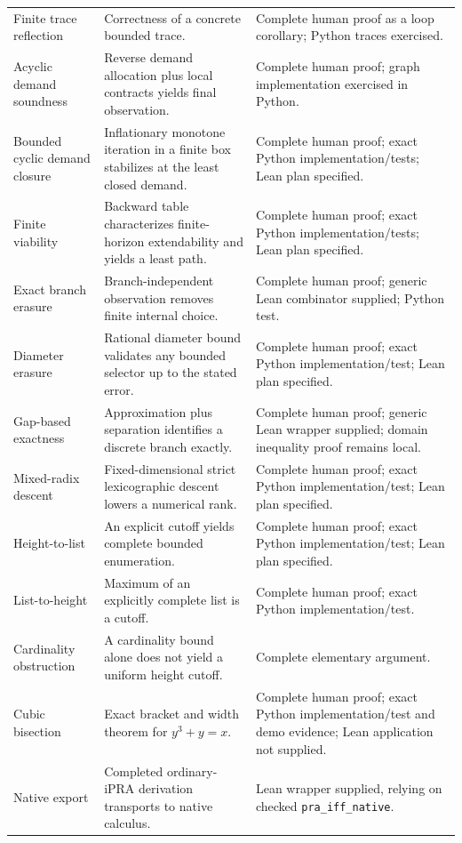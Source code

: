 \begin{longtable}{@{}p{}p{}p{}@{}}
Finite trace reflection & Correctness of a concrete bounded trace. & Complete human proof as a loop corollary; Python traces exercised. \\
Acyclic demand soundness & Reverse demand allocation plus local contracts yields final observation. & Complete human proof; graph implementation exercised in Python. \\
Bounded cyclic demand closure & Inflationary monotone iteration in a finite box stabilizes at the least closed demand. & Complete human proof; exact Python implementation/tests; Lean plan specified. \\
Finite viability & Backward table characterizes finite-horizon extendability and yields a least path. & Complete human proof; exact Python implementation/tests; Lean plan specified. \\
Exact branch erasure & Branch-independent observation removes finite internal choice. & Complete human proof; generic Lean combinator supplied; Python test. \\
Diameter erasure & Rational diameter bound validates any bounded selector up to the stated error. & Complete human proof; exact Python implementation/test; Lean plan specified. \\
Gap-based exactness & Approximation plus separation identifies a discrete branch exactly. & Complete human proof; generic Lean wrapper supplied; domain inequality proof remains local. \\
Mixed-radix descent & Fixed-dimensional strict lexicographic descent lowers a numerical rank. & Complete human proof; exact Python implementation/test; Lean plan specified. \\
Height-to-list & An explicit cutoff yields complete bounded enumeration. & Complete human proof; exact Python implementation/test; Lean plan specified. \\
List-to-height & Maximum of an explicitly complete list is a cutoff. & Complete human proof; exact Python implementation/test. \\
Cardinality obstruction & A cardinality bound alone does not yield a uniform height cutoff. & Complete elementary argument. \\
Cubic bisection & Exact bracket and width theorem for \(y^3+y=x\). & Complete human proof; exact Python implementation/test and demo evidence; Lean application not supplied. \\
Native export & Completed ordinary-iPRA derivation transports to native calculus. & Lean wrapper supplied, relying on checked \texttt{pra\_iff\_native}. \\
\bottomrule
\end{longtable}

